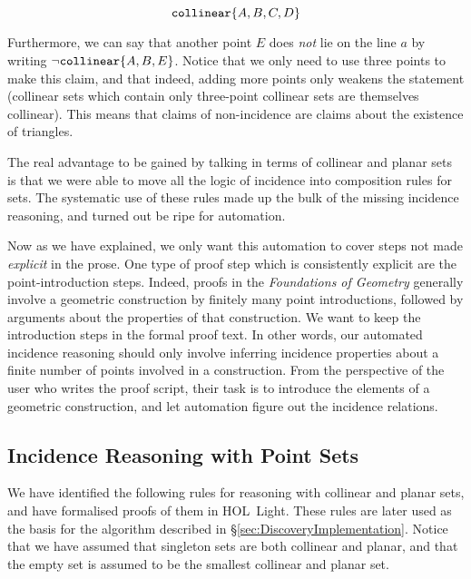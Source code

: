 \begin{displaymath}
\texttt{collinear} \{A, B, C, D\}
\end{displaymath}

Furthermore, we can say that another point $E$ does \emph{not} lie on the line $a$ by writing $\neg \texttt{collinear} \{A, B, E\}$. Notice that we only need to use three points to make this claim, and that indeed, adding more points only weakens the statement (collinear sets which contain only three-point collinear sets are themselves collinear). This means that claims of non-incidence are claims about the existence of triangles.\label{NonIncidenceTriangle}

The real advantage to be gained by talking in terms of collinear and planar sets is that we were able to move all the logic of incidence into composition rules for sets. The systematic use of these rules made up the bulk of the missing incidence reasoning, and turned out be ripe for automation.

Now as we have explained, we only want this automation to cover steps not made \emph{explicit} in the prose. One type of proof step which is consistently explicit are the point-introduction steps. Indeed, proofs in the \emph{Foundations of Geometry} generally involve a geometric construction by finitely many point introductions, followed by arguments about the properties of that construction. We want to keep the introduction steps in the formal proof text. In other words, our automated incidence reasoning should only involve inferring incidence properties about a finite number of points involved in a construction. From the perspective of the user who writes the proof script, their task is to introduce the elements of a geometric construction, and let automation figure out the incidence relations.

\subsection{Incidence Reasoning with Point Sets}
We have identified the following rules for reasoning with collinear and planar sets, and have formalised proofs of them in HOL~Light. These rules are later used as the basis for the algorithm described in  \S\ref{sec:DiscoveryImplementation}. Notice that we have assumed that singleton sets are both collinear and planar, and that the empty set is assumed to be the smallest collinear and planar set. 

